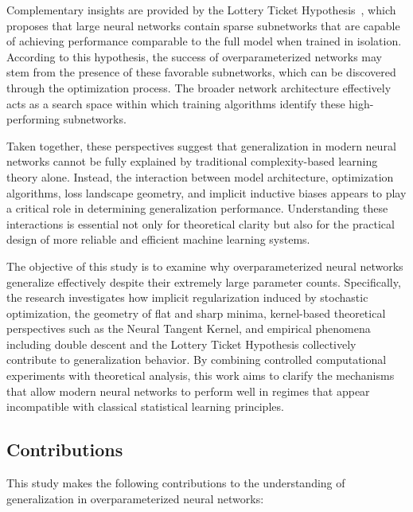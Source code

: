 \documentclass[conference]{IEEEtran}
\begin{document}
Complementary insights are provided by the Lottery Ticket Hypothesis~\cite{frankle2019lottery}, which proposes that large neural networks contain sparse subnetworks that are capable of achieving performance comparable to the full model when trained in isolation. According to this hypothesis, the success of overparameterized networks may stem from the presence of these favorable subnetworks, which can be discovered through the optimization process. The broader network architecture effectively acts as a search space within which training algorithms identify these high-performing subnetworks.

Taken together, these perspectives suggest that generalization in modern neural networks cannot be fully explained by traditional complexity-based learning theory alone. Instead, the interaction between model architecture, optimization algorithms, loss landscape geometry, and implicit inductive biases appears to play a critical role in determining generalization performance. Understanding these interactions is essential not only for theoretical clarity but also for the practical design of more reliable and efficient machine learning systems.

The objective of this study is to examine why overparameterized neural networks generalize effectively despite their extremely large parameter counts. Specifically, the research investigates how implicit regularization induced by stochastic optimization, the geometry of flat and sharp minima, kernel-based theoretical perspectives such as the Neural Tangent Kernel, and empirical phenomena including double descent and the Lottery Ticket Hypothesis collectively contribute to generalization behavior. By combining controlled computational experiments with theoretical analysis, this work aims to clarify the mechanisms that allow modern neural networks to perform well in regimes that appear incompatible with classical statistical learning principles.

\subsection{Contributions}

This study makes the following contributions to the understanding of generalization in overparameterized neural networks:
\end{document}

